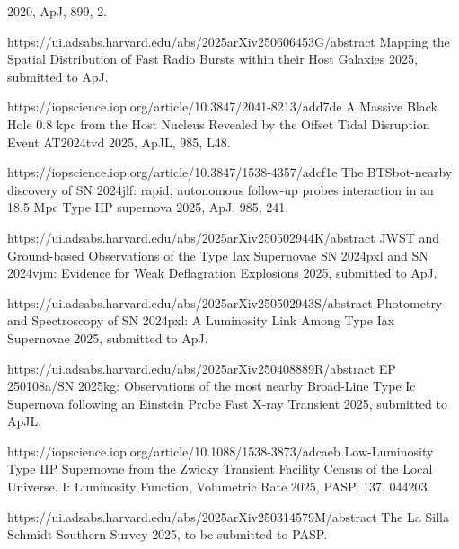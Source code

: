 \begin{cvpubs}
{\begin{cvitems}
    {2020, ApJ, 899, 2.}
    \item {}
    {\Cliu}
    {https://ui.adsabs.harvard.edu/abs/2025arXiv250606453G/abstract}
    {Mapping the Spatial Distribution of Fast Radio Bursts within their Host Galaxies}
    {2025, submitted to ApJ.}
    \item {}
    {\Cliu}
    {https://iopscience.iop.org/article/10.3847/2041-8213/add7de}
    {A Massive Black Hole 0.8 kpc from the Host Nucleus Revealed by the Offset Tidal Disruption Event AT2024tvd}
    {2025, ApJL, 985, L48.}
    \item {} 
    {\Cliu}
    {https://iopscience.iop.org/article/10.3847/1538-4357/adcf1e}
    {The BTSbot-nearby discovery of SN 2024jlf: rapid, autonomous follow-up probes interaction in an 18.5 Mpc Type IIP supernova}
    {2025, ApJ, 985, 241.}
    \item {}
    {\Cliu}
    {https://ui.adsabs.harvard.edu/abs/2025arXiv250502944K/abstract}
    {JWST and Ground-based Observations of the Type Iax Supernovae SN 2024pxl and SN 2024vjm: Evidence for Weak Deflagration Explosions}
    {2025, submitted to ApJ.}
\end{cvitems}
}
\cvpub
{
\begin{cvitems}
    \item {}
    {\Cliu}
    {https://ui.adsabs.harvard.edu/abs/2025arXiv250502943S/abstract}
    {Photometry and Spectroscopy of SN 2024pxl: A Luminosity Link Among Type Iax Supernovae}
    {2025, submitted to ApJ.}
    \item {}
    {\Cliu}
    {https://ui.adsabs.harvard.edu/abs/2025arXiv250408889R/abstract}
    {EP 250108a/SN 2025kg: Observations of the most nearby Broad-Line Type Ic Supernova following an Einstein Probe Fast X-ray Transient}
    {2025, submitted to ApJL.}
    \item {}
    {\Cliu}
    {https://iopscience.iop.org/article/10.1088/1538-3873/adcaeb}
    {Low-Luminosity Type IIP Supernovae from the Zwicky Transient Facility Census of the Local Universe. I: Luminosity Function, Volumetric Rate}
    {2025, PASP, 137, 044203.}
    \item {}
    {\Cliu}
    {https://ui.adsabs.harvard.edu/abs/2025arXiv250314579M/abstract}
    {The La Silla Schmidt Southern Survey}
    {2025, to be submitted to PASP.}

\end{cvitems}}
\end{cvpubs}
